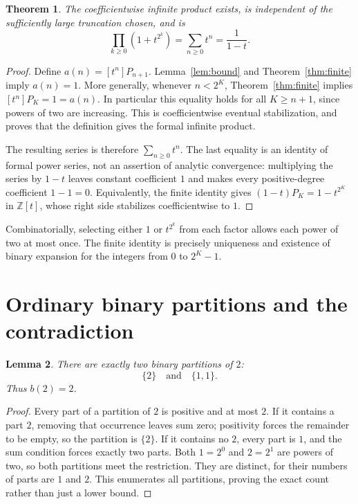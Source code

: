 \documentclass[11pt]{article}
\newtheorem{theorem}{Theorem}
\newtheorem{lemma}[theorem]{Lemma}
\newcommand{\coeff}[2]{[t^{#1}]#2}
\begin{document}
\begin{theorem}\label{thm:limit}
The coefficientwise infinite product exists, is independent of the sufficiently large truncation chosen, and is
\[
\prod_{k\geq0}(1+t^{2^k})=\sum_{n\geq0}t^n=\frac{1}{1-t}.
\]
\end{theorem}
\begin{proof}
Define $a(n)=\coeff{n}{P_{n+1}}$. Lemma~\ref{lem:bound} and Theorem~\ref{thm:finite} imply $a(n)=1$. More generally, whenever $n<2^K$, Theorem~\ref{thm:finite} implies $\coeff{n}{P_K}=1=a(n)$. In particular this equality holds for all $K\geq n+1$, since powers of two are increasing. This is coefficientwise eventual stabilization, and proves that the definition gives the formal infinite product.

The resulting series is therefore $\sum_{n\geq0}t^n$. The last equality is an identity of formal power series, not an assertion of analytic convergence: multiplying the series by $1-t$ leaves constant coefficient $1$ and makes every positive-degree coefficient $1-1=0$. Equivalently, the finite identity gives $(1-t)P_K=1-t^{2^K}$ in $\mathbb Z[t]$, whose right side stabilizes coefficientwise to $1$.
\end{proof}

Combinatorially, selecting either $1$ or $t^{2^k}$ from each factor allows each power of two at most once. The finite identity is precisely uniqueness and existence of binary expansion for the integers from $0$ to $2^K-1$.

\section{Ordinary binary partitions and the contradiction}
\begin{lemma}\label{lem:b2}
There are exactly two binary partitions of $2$:
\[
\{2\}\quad\text{and}\quad\{1,1\}.
\]
Thus $b(2)=2$.
\end{lemma}
\begin{proof}
Every part of a partition of $2$ is positive and at most $2$. If it contains a part $2$, removing that occurrence leaves sum zero; positivity forces the remainder to be empty, so the partition is $\{2\}$. If it contains no $2$, every part is $1$, and the sum condition forces exactly two parts. Both $1=2^0$ and $2=2^1$ are powers of two, so both partitions meet the restriction. They are distinct, for their numbers of parts are $1$ and $2$. This enumerates all partitions, proving the exact count rather than just a lower bound.
\end{proof}
\end{document}
